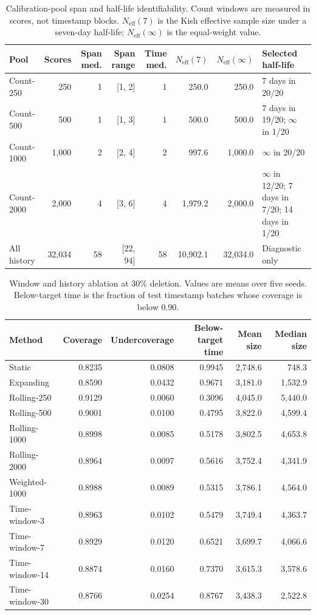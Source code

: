\documentclass[10pt,twocolumn]{article}
\begin{document}
\begin{table}[t]
\centering
\caption{Calibration-pool span and half-life identifiability. Count windows are
measured in scores, not timestamp blocks. \(N_{\mathrm{eff}}(7)\) is the Kish
effective sample size under a seven-day half-life; \(N_{\mathrm{eff}}(\infty)\)
is the equal-weight value.}
\label{tab:pool-diagnostics}
\scriptsize
\setlength{\tabcolsep}{3.5pt}
\begin{tabular}{lrrrrrrp{}}
\toprule
Pool & Scores & Span med. & Span range & Time med. & \(N_{\mathrm{eff}}(7)\) & \(N_{\mathrm{eff}}(\infty)\) & Selected half-life\\
\midrule
Count-250 & 250 & 1 & [1, 2] & 1 & 250.0 & 250.0 & 7 days in 20/20\\
Count-500 & 500 & 1 & [1, 3] & 1 & 500.0 & 500.0 & 7 days in 19/20; \(\infty\) in 1/20\\
Count-1000 & 1,000 & 2 & [2, 4] & 2 & 997.6 & 1,000.0 & \(\infty\) in 20/20\\
Count-2000 & 2,000 & 4 & [3, 6] & 4 & 1,979.2 & 2,000.0 & \(\infty\) in 12/20; 7 days in 7/20; 14 days in 1/20\\
All history & 32,034 & 58 & [22, 94] & 58 & 10,902.1 & 32,034.0 & Diagnostic only\\
\bottomrule
\end{tabular}
\end{table}

\begin{table}[t]
\centering
\caption{Window and history ablation at 30\% deletion. Values are means over
five seeds. Below-target time is the fraction of test timestamp batches whose
coverage is below 0.90.}
\label{tab:window-ablation}
\footnotesize
\setlength{\tabcolsep}{4pt}
\begin{tabular}{lrrrrr}
\toprule
Method & Coverage & Undercoverage & Below-target time & Mean size & Median size\\
\midrule
Static & 0.8235 & 0.0808 & 0.9945 & 2,748.6 & 748.3\\
Expanding & 0.8590 & 0.0432 & 0.9671 & 3,181.0 & 1,532.9\\
Rolling-250 & 0.9129 & 0.0060 & 0.3096 & 4,045.0 & 5,440.0\\
Rolling-500 & 0.9001 & 0.0100 & 0.4795 & 3,822.0 & 4,599.4\\
Rolling-1000 & 0.8998 & 0.0085 & 0.5178 & 3,802.5 & 4,653.8\\
Rolling-2000 & 0.8964 & 0.0097 & 0.5616 & 3,752.4 & 4,341.9\\
Weighted-1000 & 0.8988 & 0.0089 & 0.5315 & 3,786.1 & 4,564.0\\
Time-window-3 & 0.8963 & 0.0102 & 0.5479 & 3,749.4 & 4,363.7\\
Time-window-7 & 0.8929 & 0.0120 & 0.6521 & 3,699.7 & 4,066.6\\
Time-window-14 & 0.8874 & 0.0160 & 0.7370 & 3,615.3 & 3,578.6\\
Time-window-30 & 0.8766 & 0.0254 & 0.8767 & 3,438.3 & 2,522.8\\
\bottomrule
\end{tabular}
\end{table}
\end{document}

